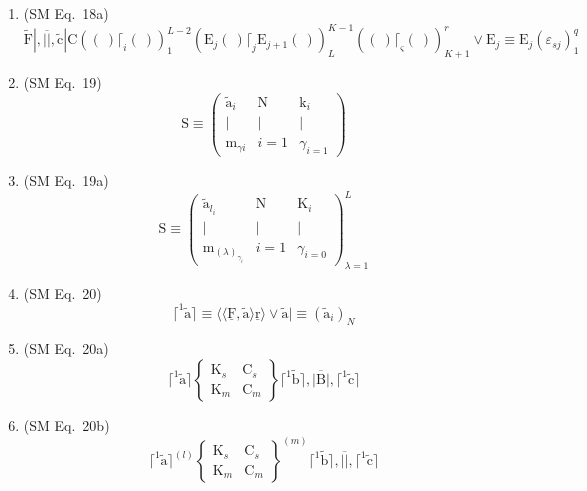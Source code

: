 \documentclass[12pt]{article}
\begin{document}
\begin{enumerate}[label=(\arabic*), series=formellist]
    \item (SM Eq.\ 18a) 
    \[
    \tilde{\mathrm{F}}|, \overline{||}, \tilde{\mathrm{c}}| \mathrm{C} \left( (\ ) \lceil_i (\ ) \right)_1^{L-2} \left( \mathrm{E}_j (\ ) \lceil_j \mathrm{E}_{j+1} (\ ) \right)_L^{K-1} \left( (\ ) \lceil_\varsigma (\ ) \right)_{K+1}^r \lor \mathrm{E}_j \equiv \mathrm{E}_j(\varepsilon_{sj})_1^q
    \]

    \item (SM Eq.\ 19) 
    \[
    \mathrm{S} \equiv \begin{pmatrix} \tilde{\mathrm{a}}_i & \mathrm{N} & \mathrm{k}_i \\ | & | & | \\ \mathrm{m}_{\gamma i} & i=1 & \gamma_{i=1} \end{pmatrix}
    \]

    \item (SM Eq.\ 19a) 
    \[
    \mathrm{S} \equiv \begin{pmatrix} \tilde{\mathrm{a}}_{l_i} & \mathrm{N} & \mathrm{K}_i \\ | & | & | \\ \mathrm{m}_{(\lambda)_{\gamma_i}} & i=1 & \gamma_{i=0} \end{pmatrix}_{\lambda=1}^L
    \]

    \item (SM Eq.\ 20) 
    \[
    \lceil^1 \tilde{\mathrm{a}} \rceil \equiv \langle\langle \underline{\mathrm{F}}, \tilde{\mathrm{a}} \rangle \underline{\mathrm{r}} \rangle \lor \tilde{\mathrm{a}}| \equiv (\tilde{\mathrm{a}}_i)_N
    \]

    \item (SM Eq.\ 20a) 
    \[
    \lceil^1 \tilde{\mathrm{a}} \rceil \left\{ \begin{smallmatrix} \mathrm{K}_s & \mathrm{C}_s \\ \mathrm{K}_m & \mathrm{C}_m \end{smallmatrix} \right\} \lceil^1 \tilde{\mathrm{b}} \rceil, \overline{|\mathrm{B}|}, \lceil^1 \tilde{\mathrm{c}} \rceil
    \]

    \item (SM Eq.\ 20b) 
    \[
    \lceil^1 \tilde{\mathrm{a}} \rceil^{(l)} \left\{ \begin{smallmatrix} \mathrm{K}_s & \mathrm{C}_s \\ \mathrm{K}_m & \mathrm{C}_m \end{smallmatrix} \right\}^{(m)} \lceil^1 \tilde{\mathrm{b}} \rceil, \overline{||}, \lceil^1 \tilde{\mathrm{c}} \rceil
    \]


\end{enumerate}
\end{document}

